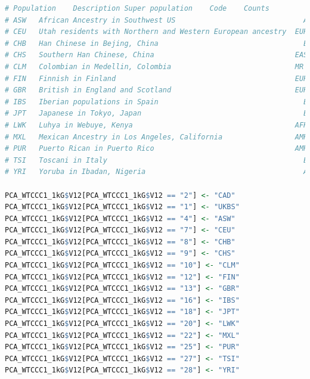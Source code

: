 \documentclass[
]{book}
\begin{document}
\begin{lstlisting}[language=R]
# Population    Description Super population    Code    Counts
# ASW   African Ancestry in Southwest US                              AFR   4     #49A01D
# CEU   Utah residents with Northern and Western European ancestry  EUR 7     #E55738
# CHB   Han Chinese in Bejing, China                                  EAS   8     #9A3480
# CHS   Southern Han Chinese, China                                 EAS 9     #705296
# CLM   Colombian in Medellin, Colombia                             MR  10    #8D5B9A
# FIN   Finnish in Finland                                          EUR 12  #2F8BC9
# GBR   British in England and Scotland                             EUR 13  #1290D9
# IBS   Iberian populations in Spain                                  EUR   16  #1396D8
# JPT   Japanese in Tokyo, Japan                                      EAS   18  #D5267B
# LWK   Luhya in Webuye, Kenya                                      AFR 20  #78B113
# MXL   Mexican Ancestry in Los Angeles, California                 AMR 22  #F59D10
# PUR   Puerto Rican in Puerto Rico                                 AMR 25  #FBB820
# TSI   Toscani in Italy                                              EUR   27  #4C81BF
# YRI   Yoruba in Ibadan, Nigeria                                     AFR   28  #C5D220

PCA_WTCCC1_1kG$V12[PCA_WTCCC1_1kG$V12 == "2"] <- "CAD"
PCA_WTCCC1_1kG$V12[PCA_WTCCC1_1kG$V12 == "1"] <- "UKBS"
PCA_WTCCC1_1kG$V12[PCA_WTCCC1_1kG$V12 == "4"] <- "ASW"
PCA_WTCCC1_1kG$V12[PCA_WTCCC1_1kG$V12 == "7"] <- "CEU"
PCA_WTCCC1_1kG$V12[PCA_WTCCC1_1kG$V12 == "8"] <- "CHB"
PCA_WTCCC1_1kG$V12[PCA_WTCCC1_1kG$V12 == "9"] <- "CHS"
PCA_WTCCC1_1kG$V12[PCA_WTCCC1_1kG$V12 == "10"] <- "CLM"
PCA_WTCCC1_1kG$V12[PCA_WTCCC1_1kG$V12 == "12"] <- "FIN"
PCA_WTCCC1_1kG$V12[PCA_WTCCC1_1kG$V12 == "13"] <- "GBR"
PCA_WTCCC1_1kG$V12[PCA_WTCCC1_1kG$V12 == "16"] <- "IBS"
PCA_WTCCC1_1kG$V12[PCA_WTCCC1_1kG$V12 == "18"] <- "JPT"
PCA_WTCCC1_1kG$V12[PCA_WTCCC1_1kG$V12 == "20"] <- "LWK"
PCA_WTCCC1_1kG$V12[PCA_WTCCC1_1kG$V12 == "22"] <- "MXL"
PCA_WTCCC1_1kG$V12[PCA_WTCCC1_1kG$V12 == "25"] <- "PUR"
PCA_WTCCC1_1kG$V12[PCA_WTCCC1_1kG$V12 == "27"] <- "TSI"
PCA_WTCCC1_1kG$V12[PCA_WTCCC1_1kG$V12 == "28"] <- "YRI"
\end{lstlisting}
\end{document}
